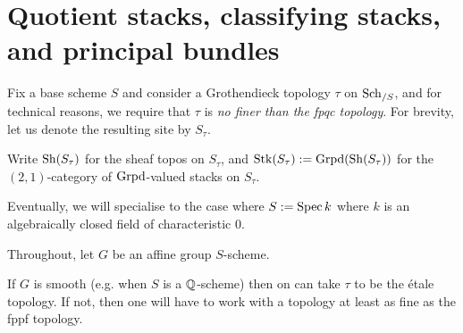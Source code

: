     \section{Quotient stacks, classifying stacks, and principal bundles}
        \begin{convention}
            Fix a base scheme $S$ and consider a Grothendieck topology $\tau$ on $\mathrm{Sch}_{/S}$, and for technical reasons, we require that $\tau$ is \textit{no finer than the fpqc topology}. For brevity, let us denote the resulting site by $S_{\tau}$. 

            Write $\mathrm{Sh}(S_{\tau})$ for the sheaf topos on $S_{\tau}$, and $\mathrm{Stk}(S_{\tau}) := \mathrm{Grpd}(\mathrm{Sh}(S_{\tau}))$ for the $(2, 1)$-category of $\mathrm{Grpd}$-valued stacks on $S_{\tau}$. 

            Eventually, we will specialise to the case where $S := \operatorname{Spec} k$ where $k$ is an algebraically closed field of characteristic $0$.
        \end{convention}

        \begin{convention}
            Throughout, let $G$ be an affine group $S$-scheme.
        \end{convention}
        \begin{remark}
            If $G$ is smooth (e.g. when $S$ is a $\mathbb{Q}$-scheme) then on can take $\tau$ to be the \'etale topology. If not, then one will have to work with a topology at least as fine as the fppf topology.
        \end{remark}

